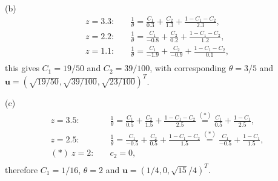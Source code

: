 \documentclass{homework}
\begin{document}
{    \noindent(b)
    \begin{align*}
        z=3.3\colon & \quad\frac 1\theta=\frac{C_1}{0.3} + \frac{C_2}{1.3} + \frac{1-C_1-C_2}{2.3},   \\
        z=2.2\colon & \quad\frac 1\theta=\frac{C_1}{-0.8} + \frac{C_2}{0.2} + \frac{1-C_1-C_2}{1.2},  \\
        z=1.1\colon & \quad\frac 1\theta=\frac{C_1}{-1.9} + \frac{C_2}{-0.9} + \frac{1-C_1-C_2}{0.1}, \\
    \end{align*}
    this gives $C_1 = 19/50$ and $C_2 = 39/100$, with corresponding $\theta = 3/5$ and $\mathbf u = (\sqrt{19/50}, \sqrt{39/100}, \sqrt{23/100})^T$.

    \noindent(c)
    \begin{align*}
        z=3.5\colon    & \quad\frac 1\theta=\frac{C_1}{0.5} + \frac{C_2}{1.5} + \frac{1-C_1-C_2}{2.5} \stackrel{(*)}{=} \frac{C_1}{0.5} + \frac{1-C_1}{2.5} , \\
        z=2.5\colon    & \quad\frac 1\theta=\frac{C_1}{-0.5} + \frac{C_2}{0.5} + \frac{1-C_1-C_2}{1.5}\stackrel{(*)}{=} \frac{C_1}{-0.5} + \frac{1-C_1}{1.5}, \\
        (*)\ z=2\colon & \quad c_2 = 0,                                                                                                                       \\
    \end{align*}
    therefore $C_1 = 1/16$, $\theta=2$ and $\mathbf u = (1/4, 0, \sqrt{15}/4)^T.$
}
\end{document}
